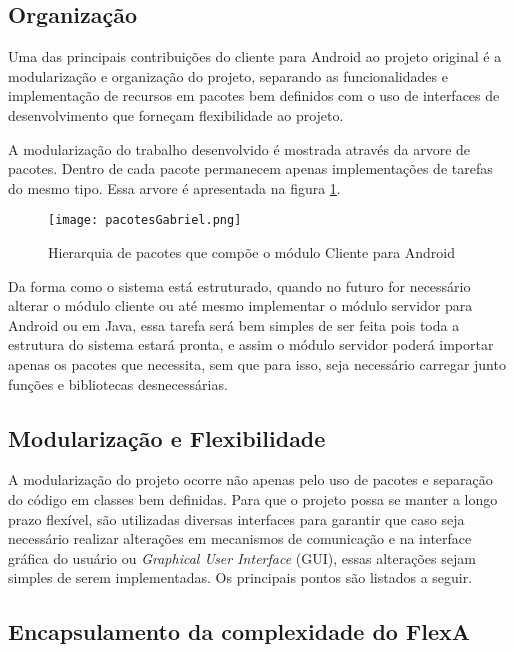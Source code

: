         \subsection{Organização}
        
        Uma das principais contribuições do cliente para Android ao projeto original é a modularização e organização do projeto, separando as funcionalidades e implementação de recursos em pacotes bem definidos com o uso de interfaces de desenvolvimento que forneçam flexibilidade ao projeto.
        
        A modularização do trabalho desenvolvido é mostrada através da arvore de pacotes. Dentro de cada pacote permanecem apenas implementações de tarefas do mesmo tipo. Essa arvore é apresentada na figura \ref{fig:arvorePacotesAndroid}.
        
        \begin{figure}[!ht]
        \centering
        \texttt{[image: pacotesGabriel.png]}
        \caption{Hierarquia de pacotes que compõe o módulo Cliente para Android}
        \label{fig:arvorePacotesAndroid}
        \end{figure}
        
        Da forma como o sistema está estruturado, quando no futuro for necessário alterar o módulo cliente ou até mesmo implementar o módulo servidor para Android ou em Java, essa tarefa será bem simples de ser feita pois toda a estrutura do sistema estará pronta, e assim o módulo servidor poderá importar apenas os pacotes que necessita, sem que para isso, seja necessário carregar junto funções e bibliotecas desnecessárias.
        
        \subsection{Modularização e Flexibilidade}
        
        A modularização do projeto ocorre não apenas pelo uso de pacotes e separação do código em classes bem definidas. Para que o projeto possa se manter a longo prazo flexível, são utilizadas diversas interfaces para garantir que caso seja necessário realizar alterações em mecanismos de comunicação e na interface gráfica do usuário ou \textit{Graphical User Interface} (GUI), essas alterações sejam simples de serem implementadas. Os principais pontos são listados a seguir.
        
         \subsection{Encapsulamento da complexidade do FlexA}
         
